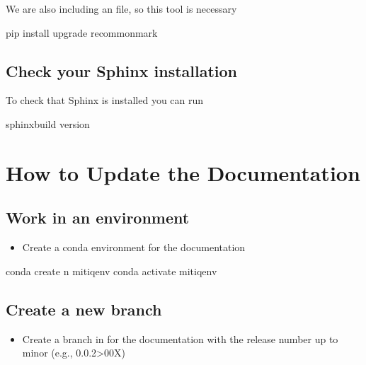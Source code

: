 \documentclass[letterpaper,10pt,english]{sphinxmanual}
\begin{document}
We are also including an  file, so this tool is necessary

\begin{sphinxVerbatim}[commandchars=\\\{\}]
pip install \PYGZhy{}\PYGZhy{}upgrade recommonmark
\end{sphinxVerbatim}


\subsection{Check your Sphinx installation}
\label{\detokenize{toc-README-docs:check-your-sphinx-installation}}
To check that Sphinx is installed you can run

\begin{sphinxVerbatim}[commandchars=\\\{\}]
sphinx\PYGZhy{}build \PYGZhy{}\PYGZhy{}version
\end{sphinxVerbatim}


\section{How to Update the Documentation}
\label{\detokenize{toc-README-docs:how-to-update-the-documentation}}

\subsection{Work in an environment}
\label{\detokenize{toc-README-docs:work-in-an-environment}}\begin{itemize}
\item {} 
Create a conda environment for the documentation

\end{itemize}

\begin{sphinxVerbatim}[commandchars=\\\{\}]
conda create \PYGZhy{}n mitiqenv
conda activate mitiqenv
\end{sphinxVerbatim}


\subsection{Create a new branch}
\label{\detokenize{toc-README-docs:create-a-new-branch}}\begin{itemize}
\item {} 
Create a branch in  for the documentation with the release number up to
minor (e.g., 0.0.2\sphinxhyphen{}\sphinxhyphen{}\sphinxhyphen{}\textgreater{}00X)

\end{itemize}
\end{document}
